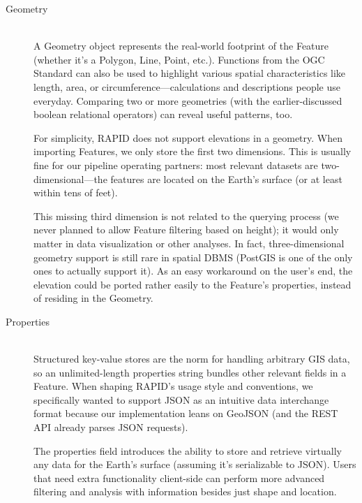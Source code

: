 \begin{description}
  \item[Geometry] \hfill \\
  A Geometry object represents the real-world footprint of the Feature (whether it's a Polygon, Line, Point, etc.). Functions from the OGC Standard can also be used to highlight various spatial characteristics like length, area, or circumference---calculations and descriptions people use everyday. Comparing two or more geometries (with the earlier-discussed boolean relational operators) can reveal useful patterns, too.
   
   For simplicity, RAPID does not support elevations in a geometry. When importing Features, we only store the first two dimensions. This is usually fine for our pipeline operating partners: most relevant datasets are two-dimensional---the features are located on the Earth's surface (or at least within tens of feet).
   
   This missing third dimension is not related to the querying process (we never planned to allow Feature filtering based on height); it would only matter in data visualization or other analyses. In fact, three-dimensional geometry support is still rare in spatial DBMS (PostGIS is one of the only ones to actually support it). As an easy workaround on the user's end, the elevation could be ported rather easily to the Feature's properties, instead of residing in the Geometry.
  
  \item[Properties] \hfill \\
  Structured key-value stores are the norm for handling arbitrary GIS data, so an unlimited-length properties string bundles other relevant fields in a Feature. When shaping RAPID's usage style and conventions, we specifically wanted to support JSON as an intuitive data interchange format because our implementation leans on GeoJSON (and the REST API already parses JSON requests).
  
  The properties field introduces the ability to store and retrieve virtually any data for the Earth's surface (assuming it's serializable to JSON). Users that need extra functionality client-side can perform more advanced filtering and analysis with information besides just shape and location.
  

\end{description}

